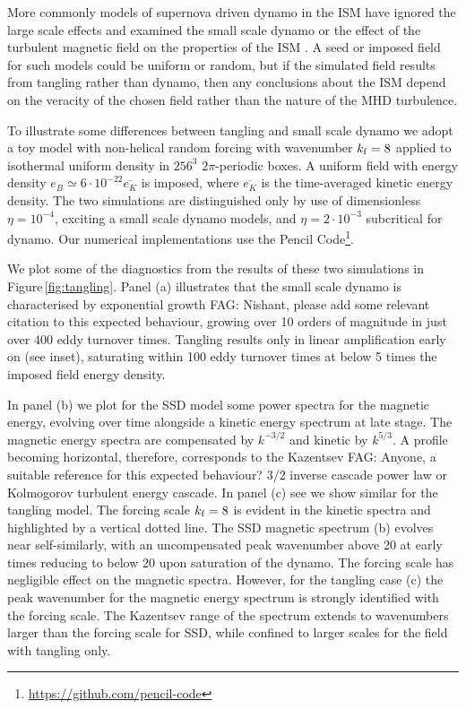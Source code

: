 \documentclass[preprint2]{aastex63}
\newcommand\kf{k_{\rm f} }
\newcommand{\fag}[1]{\textcolor{midgreen}{FAG: #1}}
\begin{document}
More commonly models of supernova driven dynamo in the ISM have ignored the 
large scale effects and examined the small scale dynamo or the effect of the
turbulent magnetic field on the properties of the ISM
\citep[e.g.,][]{BKMM04,BalKim05,MacLow:2005}.
A seed or imposed field for such models could be uniform or random, but if the
simulated field results from tangling rather than dynamo, then any conclusions
about the ISM depend on the veracity of the chosen field rather than the 
nature of the MHD turbulence.

To illustrate some differences between tangling and small scale dynamo we adopt
a toy model with non-helical random forcing with wavenumber $\kf=8$ applied to
isothermal uniform density in $256^3$ $2\pi$-periodic boxes.
A uniform field with energy density $e_B\simeq6\cdot10^{-22}\overline{e_K}$ is
imposed, where $\overline{e_K}$ is the time-averaged kinetic energy density.
The two simulations are distinguished only by use of dimensionless 
$\eta=10^{-4}$, exciting a 
small scale dynamo models, and $\eta=2\cdot10^{-3}$ subcritical for dynamo.
Our numerical implementations use the {\sc Pencil Code}\footnote{
\href{https://github.com/pencil-code}{https://github.com/pencil-code}}.

We plot some of the diagnostics from the results of these two simulations in 
Figure\,\ref{fig:tangling}.
Panel (a) illustrates that the small scale dynamo 
is characterised by exponential growth \fag{Nishant, please add some relevant citation to this expected behaviour}, growing over 10 orders of magnitude in 
just over 400 eddy turnover times.
Tangling results only in linear amplification
early on (see inset), saturating within 100 eddy turnover times at below 5 times
the imposed field energy density.

In panel (b) we plot for the SSD model some power spectra for the magnetic
energy, evolving over time alongside a kinetic energy spectrum at late stage.
The magnetic energy spectra are compensated by $k^{-3/2}$ and kinetic by
$k^{5/3}$.
A profile becoming horizontal, therefore, corresponds to the Kazentsev 
\fag{Anyone, a suitable reference for this expected behaviour?} $3/2$ inverse
cascade power law or Kolmogorov turbulent energy cascade.
In panel (c) see we show similar for the tangling model.
The forcing scale $\kf=8$ is evident in the kinetic spectra and highlighted by 
a vertical dotted line.
The SSD magnetic spectrum (b) evolves near self-similarly, with an 
uncompensated peak
wavenumber above 20 at early times reducing to below 20 upon saturation of the
dynamo.
The forcing scale has negligible effect on the magnetic spectra.
However, for the tangling case (c) the peak wavenumber for the magnetic energy
spectrum is strongly identified with the forcing scale.
The Kazentsev range of the spectrum extends to wavenumbers larger than the 
forcing scale for SSD, while confined to larger scales for the field with
tangling only. 
\end{document}
